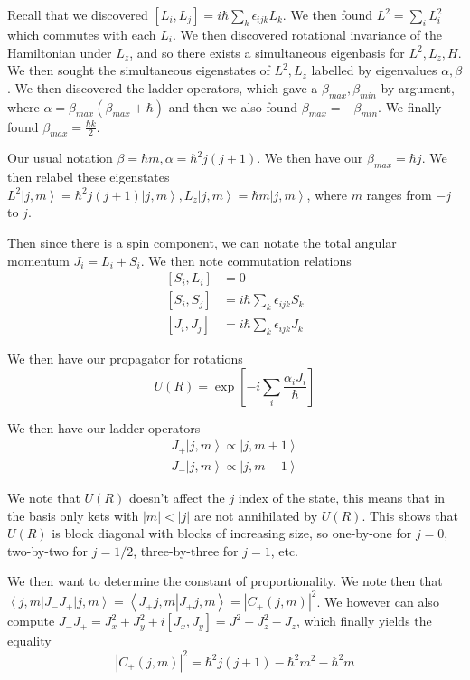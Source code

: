\documentclass[10pt]{report}
\newcommand{\bra}[1]{\left<#1\right|}
\newcommand{\ket}[1]{\left|#1\right>}
\newcommand{\dotp}[2]{\left<#1\left.\right|#2\right>}
\newcommand{\abs}[1]{\left|#1\right|}
\begin{document}
Recall that we discovered $\left[ L_i, L_j \right] = i\hbar \sum_k \epsilon_{ijk} L_k$. We then found $L^2 = \sum_i L_i^2$ which commutes with each $L_i$. We then discovered rotational invariance of the Hamiltonian under $L_z$, and so there exists a simultaneous eigenbasis for $L^2, L_z, H$. We then sought the simultaneous eigenstates of $L^2, L_z$ labelled by eigenvalues $\alpha,\beta$. We then discovered the ladder operators, which gave a $\beta_{max}, \beta_{min}$ by argument, where $\alpha = \beta_{max}(\beta_{max}+\hbar)$ and then we also found $\beta_{max} = -\beta_{min}$. We finally found $\beta_{max} = \frac{\hbar k}{2}$.

Our usual notation $\beta = \hbar m, \alpha = \hbar^2 j(j+1)$. We then have our $\beta_{max} = \hbar j$. We then relabel these eigenstates $L^2 \ket{j,m} = \hbar^2 j(j+1)\ket{j,m}, L_z \ket{j,m} = \hbar m \ket{j,m}$, where $m$ ranges from $-j$ to $j$. 

Then since there is a spin component, we can notate the total angular momentum $J_i = L_i + S_i$. We then note commutation relations \begin{align}
    \left[ S_i, L_i \right] &= 0\\
    \left[ S_i, S_j\right] &= i\hbar \sum_k \epsilon_{ijk} S_k\\
    \left[ J_i, J_j \right] &= i\hbar \sum_k \epsilon_{ijk} J_k
\end{align}

We then have our propagator for rotations
$$U(R) = \exp \left[ -i \sum_{i} \frac{\alpha_iJ_i}{\hbar} \right]$$

We then have our ladder operators
\begin{align}
    J_+ \ket{j,m} \propto \ket{j,m+1}\\
    J_- \ket{j,m} \propto \ket{j,m-1}
\end{align}

We note that $U(R)$ doesn't affect the $j$ index of the state, this means that in the basis only kets with $\abs{m} < \abs{j}$ are not annihilated by $U(R)$. This shows that $U(R)$ is block diagonal with blocks of increasing size, so one-by-one for $j=0$, two-by-two for $j=1/2$, three-by-three for $j=1$, etc.

We then want to determine the constant of proportionality. We note then that $\bra{j,m} J_- J_+ \ket{j,m} = \dotp{J_+ j,m}{J_+ j,m} = \abs{C_+(j,m)}^2$. We however can also compute $J_- J_+ = J_x^2 + J_y^2 + i\left[ J_x, J_y \right] = J^2 - J_z^2 - J_z$, which finally yields the equality
$$\abs{C_+(j,m)}^2 = \hbar^2 j(j+1) - \hbar^2 m^2 - \hbar^2 m$$
\end{document}
